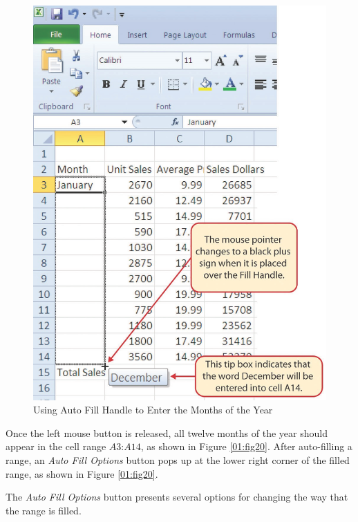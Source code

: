 \begin{figure}[H]
	\centering
	\includegraphics[width=\maxwidth{.95\linewidth}]{gfx/ch01_fig19}
	\caption{Using Auto Fill Handle to Enter the Months of the Year}
	\label{01:fig19}
\end{figure}

Once the left mouse button is released, all twelve months of the year should appear in the cell range $ A3 $:$ A14 $, as shown in Figure \ref{01:fig20}. After auto-filling a range, an \textit{Auto Fill Options} button pops up at the lower right corner of the filled range, as shown in Figure \ref{01:fig20}. 

 The \textit{Auto Fill Options} button presents several options for changing the way that the range is filled.


